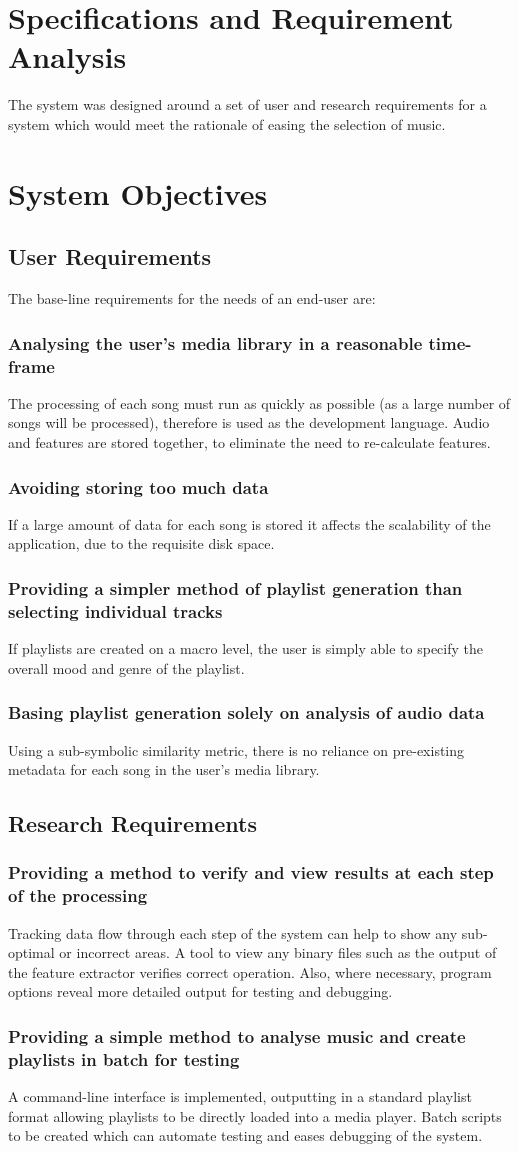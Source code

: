 \newcommand{\objective}[1]{
	\subsubsection*{#1}
}
\section{Specifications and Requirement Analysis}
The system was designed around a set of user and research requirements for a system which would meet the rationale of easing the selection of music.
\section{System Objectives}
\subsection{User Requirements}
The base-line requirements for the needs of an end-user are:
\objective{Analysing the user's media library in a reasonable time-frame}
The processing of each song must run as quickly as possible (as a large number of songs will be processed), therefore  is used as the development language. Audio and features are stored together, to eliminate the need to re-calculate features.
\objective{Avoiding storing too much data}
\label{text:spec:requirement:data}
If a large amount of data for each song is stored it affects the scalability of the application, due to the requisite disk space.
\objective{Providing a simpler method of playlist generation than selecting individual tracks}
If playlists are created on a macro level, the user is simply able to specify the overall mood and genre of the playlist.
\objective{Basing playlist generation solely on analysis of audio data}
Using a sub-symbolic similarity metric, there is no reliance on pre-existing metadata for each song in the user's media library.
\subsection{Research Requirements}
\objective{Providing a method to verify and view results at each step of the processing}
Tracking data flow through each step of the system can help to show any sub-optimal or incorrect areas. A tool to view any binary files such as the output of the feature extractor verifies correct operation. Also, where necessary, program options reveal more detailed output for testing and debugging.
\objective{Providing a simple method to analyse music and create playlists in batch for testing}
\label{text:spec:objective:cli}
A command-line interface is implemented, outputting in a standard playlist format allowing playlists to be directly loaded into a media player. Batch scripts to be created which can automate testing and eases debugging of the system.
